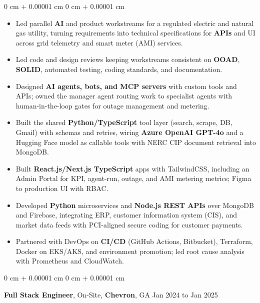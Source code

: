 \documentclass[10pt, letterpaper]{article}
\newenvironment{highlights}{
    \begin{itemize}[
        topsep=0.04 cm,
        parsep=0.04 cm,
        partopsep=0pt,
        itemsep=0pt,
        leftmargin=0 cm + 10pt
    ]
}{
    \end{itemize}
} %
\newenvironment{onecolentry}{
    \begin{adjustwidth}{
        0 cm + 0.00001 cm
    }{
        0 cm + 0.00001 cm
    }
}{
    \end{adjustwidth}
} %
\newcommand{\resumeheading}[2]{%
    \begin{onecolentry}
        #1 \hfill #2
    \end{onecolentry}
} %
\begin{document}
\begin{onecolentry}
\begin{highlights}
	\item Led parallel \textbf{AI} and product workstreams for a regulated electric and natural gas utility, turning requirements into technical specifications for \textbf{APIs} and UI across grid telemetry and smart meter (AMI) services.
	\item Led code and design reviews keeping workstreams consistent on \textbf{OOAD}, \textbf{SOLID}, automated testing, coding standards, and documentation.
	\item Designed \textbf{AI agents, bots, and MCP servers} with custom tools and APIs; owned the manager agent routing work to specialist agents with human-in-the-loop gates for outage management and metering.
	\item Built the shared \textbf{Python/TypeScript} tool layer (search, scrape, DB, Gmail) with schemas and retries, wiring \textbf{Azure OpenAI GPT-4o} and a Hugging Face model as callable tools with NERC CIP document retrieval into MongoDB.
	\item Built \textbf{React.js/Next.js TypeScript} apps with TailwindCSS, including an Admin Portal for KPI, agent-run, outage, and AMI metering metrics; Figma to production UI with RBAC.
	\item Developed \textbf{Python} microservices and \textbf{Node.js REST APIs} over MongoDB and Firebase, integrating ERP, customer information system (CIS), and market data feeds with PCI-aligned secure coding for customer payments.
	\item Partnered with DevOps on \textbf{CI/CD} (GitHub Actions, Bitbucket), Terraform, Docker on EKS/AKS, and environment promotion; led root cause analysis with Prometheus and CloudWatch.
\end{highlights}
\end{onecolentry}


\vspace{0.15 cm}
\resumeheading{\textbf{Full Stack Engineer}, On-Site, \textbf{Chevron}, GA}{Jan 2024 to Jan 2025}
\end{document}
